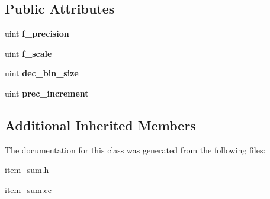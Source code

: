 \subsection*{Public Attributes}
\begin{DoxyCompactItemize}
\item 
\mbox{\label{classItem__avg__field_a524bc76ced294ee51516a4af98b55f3b}} 
uint {\bfseries f\+\_\+precision}
\item 
\mbox{\label{classItem__avg__field_aa467e705dc756ba716ed4e89aa2d87a8}} 
uint {\bfseries f\+\_\+scale}
\item 
\mbox{\label{classItem__avg__field_a70eabbf7c7b800992e9c213d56c7c365}} 
uint {\bfseries dec\+\_\+bin\+\_\+size}
\item 
\mbox{\label{classItem__avg__field_a43c435a608853b4f43a6a50479879668}} 
uint {\bfseries prec\+\_\+increment}
\end{DoxyCompactItemize}
\subsection*{Additional Inherited Members}


The documentation for this class was generated from the following files\+:\begin{DoxyCompactItemize}
\item 
item\+\_\+sum.\+h\item 
\mbox{\hyperlink{item__sum_8cc}{item\+\_\+sum.\+cc}}\end{DoxyCompactItemize}

